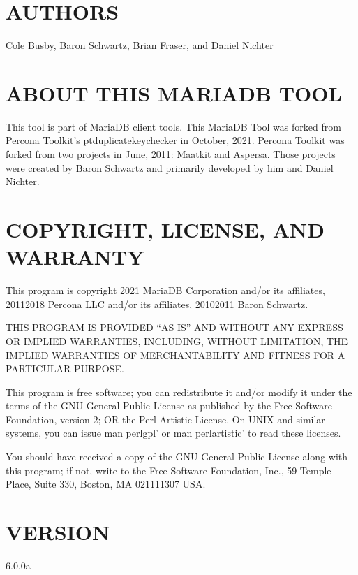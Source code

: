 \documentclass[letterpaper,10pt,english]{sphinxmanual}
\begin{document}
\section{AUTHORS}
\label{\detokenize{mariadb-index-checker:authors}}
Cole Busby, Baron Schwartz, Brian Fraser, and Daniel Nichter


\section{ABOUT THIS MARIADB TOOL}
\label{\detokenize{mariadb-index-checker:about-this-mariadb-tool}}
This tool is part of MariaDB client tools. This MariaDB Tool was forked from
Percona Toolkit’s pt\sphinxhyphen{}duplicate\sphinxhyphen{}key\sphinxhyphen{}checker in October, 2021. Percona Toolkit
was forked from two projects in June, 2011: Maatkit and Aspersa.
Those projects were created by Baron Schwartz and primarily developed by him
and Daniel Nichter.


\section{COPYRIGHT, LICENSE, AND WARRANTY}
\label{\detokenize{mariadb-index-checker:copyright-license-and-warranty}}
This program is copyright 2021 MariaDB Corporation and/or its affiliates,
2011\sphinxhyphen{}2018 Percona LLC and/or its affiliates, 2010\sphinxhyphen{}2011 Baron Schwartz.

THIS PROGRAM IS PROVIDED “AS IS” AND WITHOUT ANY EXPRESS OR IMPLIED
WARRANTIES, INCLUDING, WITHOUT LIMITATION, THE IMPLIED WARRANTIES OF
MERCHANTABILITY AND FITNESS FOR A PARTICULAR PURPOSE.

This program is free software; you can redistribute it and/or modify it under
the terms of the GNU General Public License as published by the Free Software
Foundation, version 2; OR the Perl Artistic License.  On UNIX and similar
systems, you can issue \textasciigrave{}man perlgpl’ or \textasciigrave{}man perlartistic’ to read these
licenses.

You should have received a copy of the GNU General Public License along with
this program; if not, write to the Free Software Foundation, Inc., 59 Temple
Place, Suite 330, Boston, MA  02111\sphinxhyphen{}1307  USA.


\section{VERSION}
\label{\detokenize{mariadb-index-checker:version}}
 6.0.0a
\end{document}
